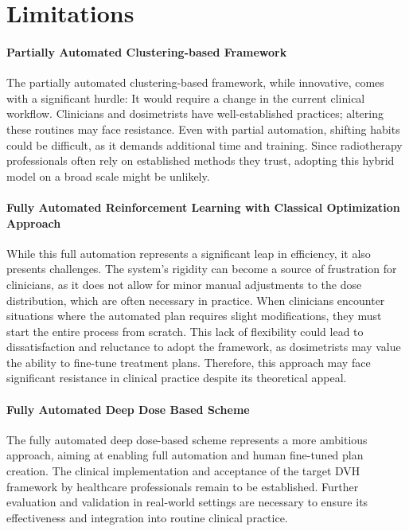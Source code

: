 \section{Limitations}
\paragraph{Partially Automated Clustering-based Framework}
The partially automated clustering-based framework, while innovative, comes with a significant hurdle:
It would require a change in the current clinical workflow.
Clinicians and dosimetrists have well-established practices; altering these routines may face resistance.
Even with partial automation, shifting habits could be difficult, as it demands additional time and training.
Since radiotherapy professionals often rely on established methods they trust, adopting this hybrid model on a broad scale might be unlikely.

\paragraph{Fully Automated Reinforcement Learning with Classical Optimization Approach}
While this full automation represents a significant leap in efficiency, it also presents challenges.
The system's rigidity can become a source of frustration for clinicians, as it does not allow for minor manual adjustments to the dose distribution, which are often necessary in practice.
When clinicians encounter situations where the automated plan requires slight modifications, they must start the entire process from scratch.
This lack of flexibility could lead to dissatisfaction and reluctance to adopt the framework, as dosimetrists may value the ability to fine-tune treatment plans.
Therefore, this approach may face significant resistance in clinical practice despite its theoretical appeal.

\paragraph{Fully Automated Deep Dose Based Scheme}
The fully automated deep dose-based scheme represents a more ambitious approach, aiming at enabling full automation and human fine-tuned plan creation.
The clinical implementation and acceptance of the target DVH framework by healthcare professionals remain to be established.
Further evaluation and validation in real-world settings are necessary to ensure its effectiveness and integration into routine clinical practice.

